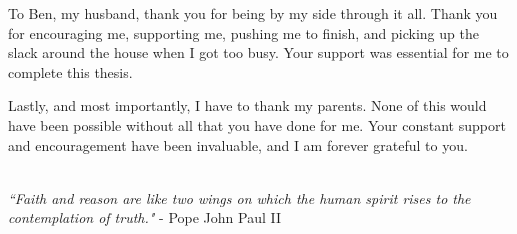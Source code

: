 To Ben, my husband, thank you for being by my side through it all. 
Thank you for encouraging me, supporting me, pushing me to finish, and picking up the slack around the house when I got too busy.
Your support was essential for me to complete this thesis.

Lastly, and most importantly, I have to thank my parents. 
None of this would have been possible without all that you have done for me. 
Your constant support and encouragement have been invaluable, and I am forever grateful to you. 
\\ \\
\begin{center}
\textit{``Faith and reason are like two wings on which the human spirit rises to the contemplation of truth."} - Pope John Paul II
\end{center}
